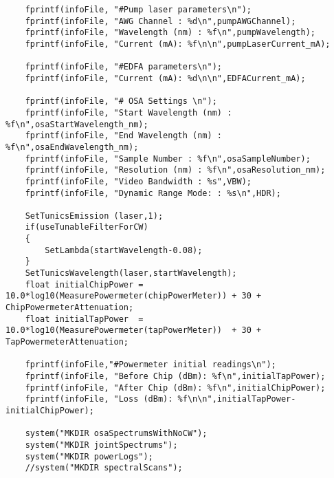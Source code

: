 \begin{lstlisting}
    fprintf(infoFile, "#Pump laser parameters\n");
    fprintf(infoFile, "AWG Channel : %d\n",pumpAWGChannel);
    fprintf(infoFile, "Wavelength (nm) : %f\n",pumpWavelength);
    fprintf(infoFile, "Current (mA): %f\n\n",pumpLaserCurrent_mA);

    fprintf(infoFile, "#EDFA parameters\n");
    fprintf(infoFile, "Current (mA): %d\n\n",EDFACurrent_mA);

    fprintf(infoFile, "# OSA Settings \n");
    fprintf(infoFile, "Start Wavelength (nm) : %f\n",osaStartWavelength_nm);
    fprintf(infoFile, "End Wavelength (nm) : %f\n",osaEndWavelength_nm);
    fprintf(infoFile, "Sample Number : %f\n",osaSampleNumber);
    fprintf(infoFile, "Resolution (nm) : %f\n",osaResolution_nm);
    fprintf(infoFile, "Video Bandwidth : %s",VBW);
    fprintf(infoFile, "Dynamic Range Mode: : %s\n",HDR);

    SetTunicsEmission (laser,1);
    if(useTunableFilterForCW)
    {
        SetLambda(startWavelength-0.08);
    }
    SetTunicsWavelength(laser,startWavelength);
    float initialChipPower = 10.0*log10(MeasurePowermeter(chipPowerMeter)) + 30 + ChipPowermeterAttenuation;
    float initialTapPower  = 10.0*log10(MeasurePowermeter(tapPowerMeter))  + 30 + TapPowermeterAttenuation;

    fprintf(infoFile,"#Powermeter initial readings\n");
    fprintf(infoFile, "Before Chip (dBm): %f\n",initialTapPower);
    fprintf(infoFile, "After Chip (dBm): %f\n",initialChipPower);
    fprintf(infoFile, "Loss (dBm): %f\n\n",initialTapPower-initialChipPower);

    system("MKDIR osaSpectrumsWithNoCW");
    system("MKDIR jointSpectrums");
    system("MKDIR powerLogs");
    //system("MKDIR spectralScans");


\end{lstlisting}
